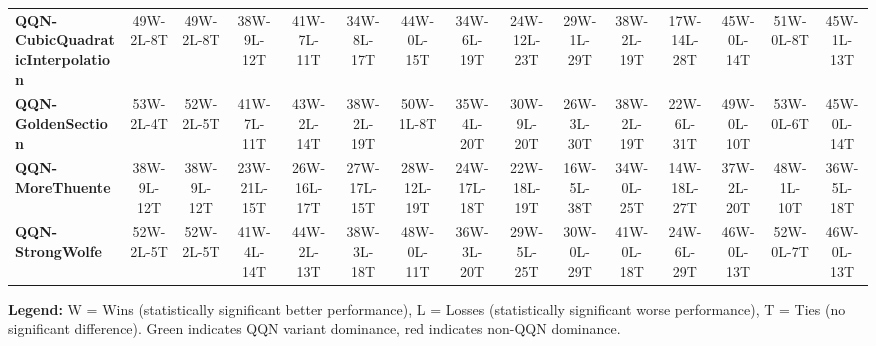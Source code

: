 \documentclass[11pt]{article}
\begin{document}
\begin{table}[H]
{\begin{tabular}{lcccccccccccccc}
\textbf{QQN-CubicQuadraticInterpolation} & \textcolor{green!70!black}{49W-2L-8T} & \textcolor{green!70!black}{49W-2L-8T} & \textcolor{green!70!black}{38W-9L-12T} & \textcolor{green!70!black}{41W-7L-11T} & \textcolor{green!70!black}{34W-8L-17T} & \textcolor{green!70!black}{44W-0L-15T} & \textcolor{green!70!black}{34W-6L-19T} & \textcolor{green!70!black}{24W-12L-23T} & \textcolor{green!70!black}{29W-1L-29T} & \textcolor{green!70!black}{38W-2L-19T} & \textcolor{green!70!black}{17W-14L-28T} & \textcolor{green!70!black}{45W-0L-14T} & \textcolor{green!70!black}{51W-0L-8T} & \textcolor{green!70!black}{45W-1L-13T} \\
\textbf{QQN-GoldenSection} & \textcolor{green!70!black}{53W-2L-4T} & \textcolor{green!70!black}{52W-2L-5T} & \textcolor{green!70!black}{41W-7L-11T} & \textcolor{green!70!black}{43W-2L-14T} & \textcolor{green!70!black}{38W-2L-19T} & \textcolor{green!70!black}{50W-1L-8T} & \textcolor{green!70!black}{35W-4L-20T} & \textcolor{green!70!black}{30W-9L-20T} & \textcolor{green!70!black}{26W-3L-30T} & \textcolor{green!70!black}{38W-2L-19T} & \textcolor{green!70!black}{22W-6L-31T} & \textcolor{green!70!black}{49W-0L-10T} & \textcolor{green!70!black}{53W-0L-6T} & \textcolor{green!70!black}{45W-0L-14T} \\
\textbf{QQN-MoreThuente} & \textcolor{green!70!black}{38W-9L-12T} & \textcolor{green!70!black}{38W-9L-12T} & \textcolor{green!70!black}{23W-21L-15T} & \textcolor{green!70!black}{26W-16L-17T} & \textcolor{green!70!black}{27W-17L-15T} & \textcolor{green!70!black}{28W-12L-19T} & \textcolor{green!70!black}{24W-17L-18T} & \textcolor{green!70!black}{22W-18L-19T} & \textcolor{green!70!black}{16W-5L-38T} & \textcolor{green!70!black}{34W-0L-25T} & \textcolor{red!70!black}{14W-18L-27T} & \textcolor{green!70!black}{37W-2L-20T} & \textcolor{green!70!black}{48W-1L-10T} & \textcolor{green!70!black}{36W-5L-18T} \\
\textbf{QQN-StrongWolfe} & \textcolor{green!70!black}{52W-2L-5T} & \textcolor{green!70!black}{52W-2L-5T} & \textcolor{green!70!black}{41W-4L-14T} & \textcolor{green!70!black}{44W-2L-13T} & \textcolor{green!70!black}{38W-3L-18T} & \textcolor{green!70!black}{48W-0L-11T} & \textcolor{green!70!black}{36W-3L-20T} & \textcolor{green!70!black}{29W-5L-25T} & \textcolor{green!70!black}{30W-0L-29T} & \textcolor{green!70!black}{41W-0L-18T} & \textcolor{green!70!black}{24W-6L-29T} & \textcolor{green!70!black}{46W-0L-13T} & \textcolor{green!70!black}{52W-0L-7T} & \textcolor{green!70!black}{46W-0L-13T} \\
\bottomrule
\end{tabular}
}
\end{table}
\textbf{Legend:} W = Wins (statistically significant better performance), L = Losses (statistically significant worse performance), T = Ties (no significant difference). Green indicates QQN variant dominance, red indicates non-QQN dominance.
\end{document}
